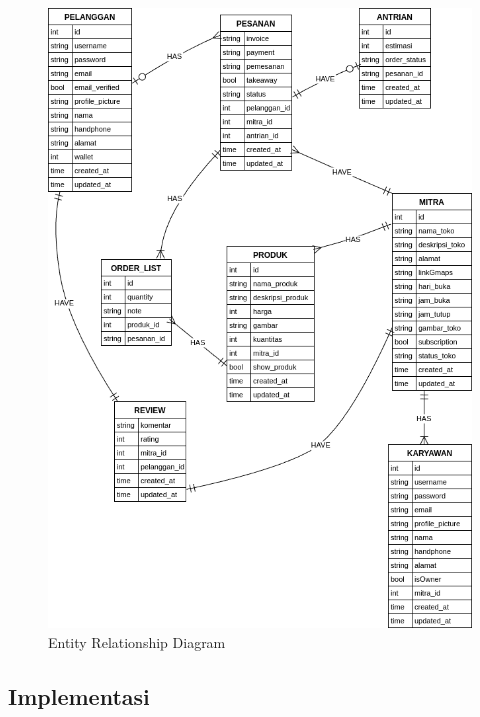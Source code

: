 \begin{figure}[p]
  \centering
  \includegraphics[width=1\textwidth]{drawio/erd.mermaid.png}
  \caption{Entity Relationship Diagram}
  \label{erd}
\end{figure}

\subsection{Implementasi}
